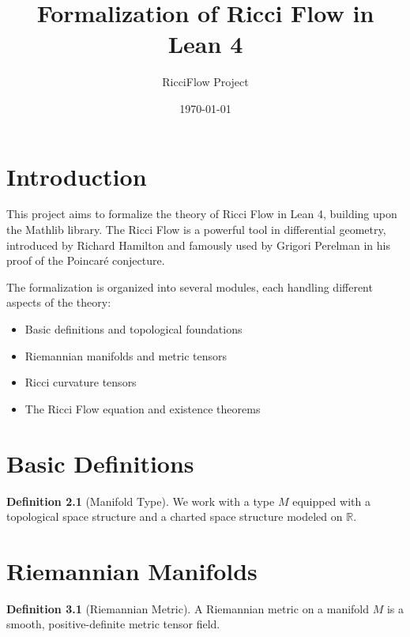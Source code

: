 \documentclass[a4paper]{report}
\title{Formalization of Ricci Flow in Lean 4}
\author{RicciFlow Project}
\date{\today}
\theoremstyle{definition}
\newtheorem{definition}[theorem]{Definition}
\theoremstyle{remark}
\begin{document}
\maketitle

\tableofcontents

\chapter{Introduction}

This project aims to formalize the theory of Ricci Flow in Lean 4, building upon the Mathlib library. The Ricci Flow is a powerful tool in differential geometry, introduced by Richard Hamilton and famously used by Grigori Perelman in his proof of the Poincaré conjecture.

The formalization is organized into several modules, each handling different aspects of the theory:
\begin{itemize}
\item Basic definitions and topological foundations
\item Riemannian manifolds and metric tensors
\item Ricci curvature tensors
\item The Ricci Flow equation and existence theorems
\end{itemize}

\chapter{Basic Definitions}
\label{chap:basic}

\begin{definition}[Manifold Type]
\label{def:manifold-type}
\leanok
We work with a type $M$ equipped with a topological space structure and a charted space structure modeled on $\mathbb{R}$.
\end{definition}

\chapter{Riemannian Manifolds}
\label{chap:riemannian}

\begin{definition}[Riemannian Metric]
\label{def:riemannian-metric}
A Riemannian metric on a manifold $M$ is a smooth, positive-definite metric tensor field.
\end{definition}
\end{document}
